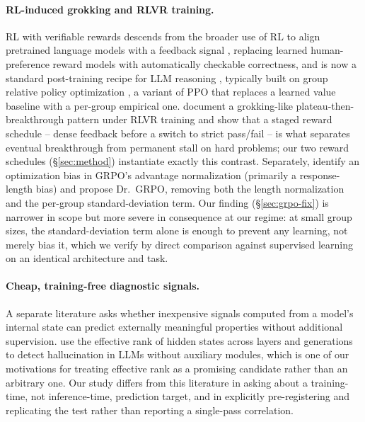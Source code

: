 \documentclass{article}
\begin{document}
\paragraph{RL-induced grokking and RLVR training.} RL with verifiable rewards
descends from the broader use of RL to align pretrained language models with
a feedback signal \citep{ouyang2022training}, replacing learned human-preference
reward models with automatically checkable correctness, and is now a standard
post-training recipe for LLM reasoning
\citep{guo2025deepseekr1,shao2024deepseekmath}, typically built on group
relative policy optimization \citep[GRPO;][]{shao2024deepseekmath}, a variant
of PPO \citep{schulman2017ppo} that replaces a learned value baseline with a
per-group empirical one. \citet{sun2026rlgrokking} document a grokking-like
plateau-then-breakthrough pattern under RLVR training and show that a staged
reward schedule -- dense feedback before a switch to strict pass/fail -- is
what separates eventual breakthrough from permanent stall on hard problems;
our two reward schedules (\S\ref{sec:method}) instantiate exactly this
contrast. Separately, \citet{liu2025understanding} identify an optimization
bias in GRPO's advantage normalization (primarily a response-length bias) and
propose Dr.~GRPO, removing both the length normalization and the per-group
standard-deviation term. Our finding (\S\ref{sec:grpo-fix}) is narrower in
scope but more severe in consequence at our regime: at small group sizes, the
standard-deviation term alone is enough to prevent any learning, not merely
bias it, which we verify by direct comparison against supervised learning on
an identical architecture and task.

\paragraph{Cheap, training-free diagnostic signals.} A separate literature asks
whether inexpensive signals computed from a model's internal state can predict
externally meaningful properties without additional supervision.
\citet{wang2025revisiting} use the effective rank of hidden states across
layers and generations to detect hallucination in LLMs without auxiliary
modules, which is one of our motivations for treating effective rank as a
promising candidate rather than an arbitrary one. Our study differs from this
literature in asking about a training-time, not inference-time, prediction
target, and in explicitly pre-registering and replicating the test rather than
reporting a single-pass correlation.
\end{document}
